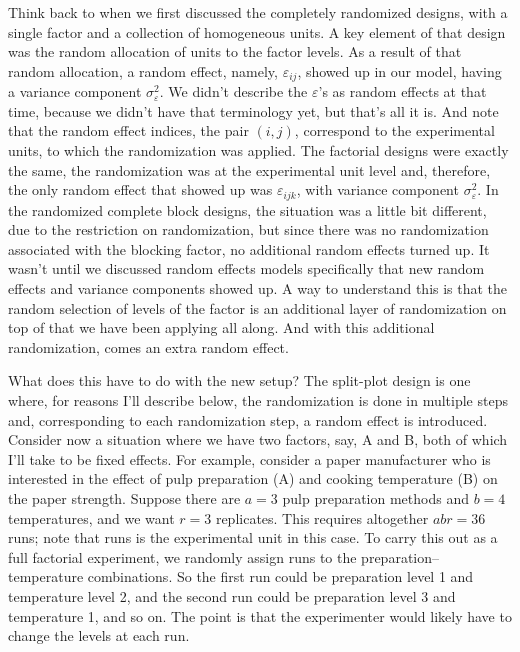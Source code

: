 \documentclass[a4paper, 12pt]{article}
\theoremstyle{plain}
\theoremstyle{definition}
\theoremstyle{remark}
\newcommand{\eps}{\varepsilon}
\begin{document}
Think back to when we first discussed the completely randomized designs, with a single factor and a collection of homogeneous units.  A key element of that design was the random allocation of units to the factor levels.  As a result of that random allocation, a random effect, namely, $\eps_{ij}$, showed up in our model, having a variance component $\sigma_\eps^2$.  We didn't describe the $\eps$'s as random effects at that time, because we didn't have that terminology yet, but that's all it is.  And note that the random effect indices, the pair $(i,j)$, correspond to the experimental units, to which the randomization was applied.  The factorial designs were exactly the same, the randomization was at the experimental unit level and, therefore, the only random effect that showed up was $\eps_{ijk}$, with variance component $\sigma_\eps^2$.  In the randomized complete block designs, the situation was a little bit different, due to the restriction on randomization, but since there was no randomization associated with the blocking factor, no additional random effects turned up.  It wasn't until we discussed random effects models specifically that new random effects and variance components showed up.  A way to understand this is that the random selection of levels of the factor is an additional layer of randomization on top of that we have been applying all along.  And with this additional randomization, comes an extra random effect.  

What does this have to do with the new setup?  The split-plot design is one where, for reasons I'll describe below, the randomization is done in multiple steps and, corresponding to each randomization step, a random effect is introduced.  Consider now a situation where we have two factors, say, A and B, both of which I'll take to be fixed effects.  For example, consider a paper manufacturer who is interested in the effect of pulp preparation (A) and cooking temperature (B) on the paper strength.  Suppose there are $a=3$ pulp preparation methods and $b=4$ temperatures, and we want $r=3$ replicates.  This requires altogether $abr = 36$ runs; note that runs is the experimental unit in this case.  To carry this out as a full factorial experiment, we randomly assign runs to the preparation--temperature combinations.  So the first run could be preparation level 1 and temperature level 2, and the second run could be preparation level 3 and temperature 1, and so on.  The point is that the experimenter would likely have to change the levels at each run.  
\end{document}
